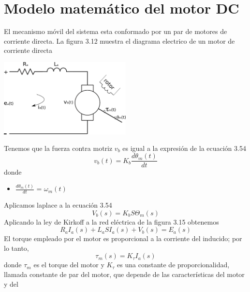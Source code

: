 \section{Modelo matemático del motor DC}
El mecanismo móvil del sistema esta conformado por un par de motores de corriente directa.
La figura 3.12 muestra el diagrama electrico de un motor de corriente directa
\begin{center}
	\includegraphics[width=0.5\textwidth]{Contenido/Cuerpo/Capitulo3/Fig16.eps}
	\label{fig:ModeloMat:Fig1}
\end{center}
Tenemos que la fuerza contra motriz $v_b$ es igual a la expresión de la ecuación 3.54
\begin{equation}
	v_b(t) =K_b \frac{d\theta_m(t)}{dt}
\end{equation}
donde
\begin{itemize}
	\item $ \frac{d\theta_m(t)}{dt} $ = $ \omega_m(t) $
\end{itemize}
Aplicamos laplace a la ecuación 3.54
\begin{equation}
	V_b(s) = K_bS\Theta_m(s)
\end{equation}
Aplicando la ley de Kirkoff a la red eléctrica de la figura 3.15 obtenemos
\begin{equation}
	R_aI_a(s) + L_aSI_a(s) + V_b(s) = E_a(s)
\end{equation}
El torque empleado por el motor es proporcional a la corriente del inducido; por lo tanto,
\begin{equation}
	\tau_m(s) = K_\tau I_a(s)
\end{equation}
donde $\tau_m$ es el torque del motor y $K_\tau$ es una constante de proporcionalidad, llamada constante de par del motor, que depende de las características del motor y del

